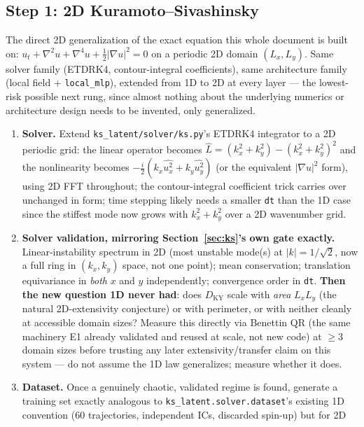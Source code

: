 \documentclass[11pt]{article}
\begin{document}
\subsection{Step 1: 2D Kuramoto--Sivashinsky}
\label{step:2dks}

The direct 2D generalization of the exact equation this whole document
is built on: $u_t + \nabla^2 u + \nabla^4 u + \tfrac{1}{2}|\nabla u|^2 =
0$ on a periodic 2D domain $(L_x, L_y)$. Same solver family (ETDRK4,
contour-integral coefficients), same architecture family (local field
+ \texttt{local\_mlp}), extended from 1D to 2D at every layer --- the
lowest-risk possible next rung, since almost nothing about the
underlying numerics or architecture design needs to be invented, only
generalized.

\begin{enumerate}[nosep]
\item \textbf{Solver.} Extend \texttt{ks\_latent/solver/ks.py}'s ETDRK4
  integrator to a 2D periodic grid: the linear operator becomes
  $\hat L = (k_x^2+k_y^2) - (k_x^2+k_y^2)^2$ and the nonlinearity becomes
  $-\tfrac{i}{2}(k_x \widehat{u_x^2} + k_y \widehat{u_y^2})$ (or the
  equivalent $|\nabla u|^2$ form), using 2D FFT throughout; the
  contour-integral coefficient trick carries over unchanged in form; time
  stepping likely needs a smaller \texttt{dt} than the 1D case since the
  stiffest mode now grows with $k_x^2+k_y^2$ over a 2D wavenumber grid.
\item \textbf{Solver validation, mirroring Section~\ref{sec:ks}'s own
  gate exactly.} Linear-instability spectrum in 2D (most unstable
  mode(s) at $|k|=1/\sqrt2$, now a full ring in $(k_x,k_y)$ space, not
  one point); mean conservation; translation equivariance in
  \emph{both} $x$ and $y$ independently; convergence order in
  \texttt{dt}. \textbf{Then the new question 1D never had}: does
  $D_{\mathrm{KY}}$ scale with \emph{area} $L_x L_y$ (the natural
  2D-extensivity conjecture) or with perimeter, or with neither cleanly
  at accessible domain sizes? Measure this directly via Benettin QR
  (the same machinery E1 already validated and reused at scale, not new
  code) at $\geq 3$ domain sizes before trusting any later
  extensivity/transfer claim on this system --- do not assume the 1D
  law generalizes; measure whether it does.
\item \textbf{Dataset.} Once a genuinely chaotic, validated regime is
  found, generate a training set exactly analogous to
  \texttt{ks\_latent.solver.dataset}'s existing 1D convention (60
  trajectories, independent ICs, discarded spin-up) but for 2D

\end{enumerate}
\end{document}

